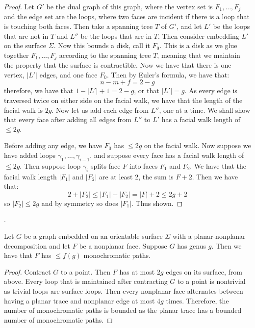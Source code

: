 \begin{proof}
	Let \(G'\) be the dual graph of this graph, where the vertex set is \(F_1, \ldots, F_j\) and the edge set are the loops, where two faces are incident if there is a loop that is touching both faces. Then take a spanning tree \(T\) of \(G'\), and let \(L'\) be the loops that are not in \(T\) and \(L''\) be the loops that are in \(T\).
	Then consider embedding \(L'\) on the surface \(\Sigma\). Now this bounds a disk, call it \(F_0\). This is a disk as we glue together \(F_1, \ldots, F_j\) according to the spanning tree \(T\), meaning that we maintain the property that the surface is contractible.
	Now we have that there is one vertex, \(|L'|\) edges, and one face \(F_0\). Then by Euler's formula, we have that:
	\begin{equation}
		n - m + f = 2 - g
	\end{equation}
	therefore, we have that \(1 - |L'| + 1 = 2 - g\), or that \(|L'| = g\). As every edge is traversed twice on either side on the facial walk, we have that the length of the facial walk is \(2g\).
	Now let us add each edge from \(L''\), one at a time. We shall show that every face after adding all edges from \(L''\) to \(L'\) has a facial walk length of \(\leq 2g\).

	Before adding any edge, we have \(F_0\) has \(\leq 2g\) on the facial walk. Now suppose we have added loops \(\gamma_1, \ldots, \gamma_{i - 1}\), and suppose every face has a facial walk length of \(\leq 2g\).
	Then suppose loop \(\gamma_i\) splits face \(F\) into faces \(F_1\) and \(F_2\). We have that the facial walk length \(|F_1|\) and \(|F_2|\) are at least 2, the sum is \(F + 2\). Then we have that:
	\begin{equation}
		2 + |F_2| \leq |F_1| + |F_2| = |F| + 2 \leq 2g + 2
	\end{equation}
	so \(|F_2| \leq 2g\) and by symmetry so does \(|F_1|\). Thus shown.
\end{proof}
.

\begin{corollary}\label{corr:orientable_nonplanar_faces}
	Let \(G\) be a graph embedded on an orientable surface \(\Sigma\) with a planar-nonplanar decomposition and let \(F\) be a nonplanar face. Suppose \(G\) has genus \(g\). Then we have that \(F\) has \(\leq f(g)\) monochromatic paths.
\end{corollary}

\begin{proof}
	Contract \(G\) to a point. Then \(F\) has at most \(2g\) edges on its surface, from above. Every loop that is maintained after contracting $G$ to a point is nontrivial as trivial loops are surface loops.
	Then every nonplanar face alternates between having a planar trace and nonplanar edge at most \(4g\) times. Therefore, the number of monochromatic paths is bounded as the planar trace has a bounded number of monochromatic paths.
\end{proof}

